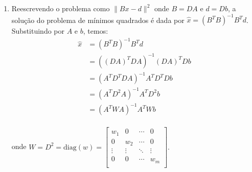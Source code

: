 \documentclass[a4paper,12pt]{article}
\begin{document}
\begin{enumerate}
\begin{enumerate}
        $$
        D = \begin{bmatrix}
            \sqrt{w_1} &  0 & \cdots &0 \\
             0& \sqrt{w_2} & \cdots &0 \\
              \vdots& \vdots & \ddots & \vdots \\
            0 &0 & \cdots & \sqrt{w_m}\\
        \end{bmatrix}.
        $$
        \item Reescrevendo o problema como $\|B x - d\|^2$ onde $B = DA$ e $d = Db$, a solução do problema de mínimos quadrados é dada por $\hat{x} = (B^TB)^{-1}B^Td$. Substituindo por $A$ e $b$, temos:
        \begin{align*}
            \hat{x} &=  (B^TB)^{-1}B^Td\\
            &= ((DA)^TDA)^{-1}(DA)^TDb\\
            &= (A^TD^TDA)^{-1}A^TD^TDb\\
            &= (A^TD^2A)^{-1}A^TD^2b\\
            &= (A^TWA)^{-1}A^TWb\\
        \end{align*}

        onde $W = D^2 = \text{diag}(w) =  \begin{bmatrix}
            {w_1} &  0 & \cdots &0 \\
             0& {w_2} & \cdots &0 \\
              \vdots& \vdots & \ddots & \vdots \\
            0 &0 & \cdots & {w_m}\\
        \end{bmatrix}.$
    \end{enumerate}
\end{enumerate}
\end{document}
